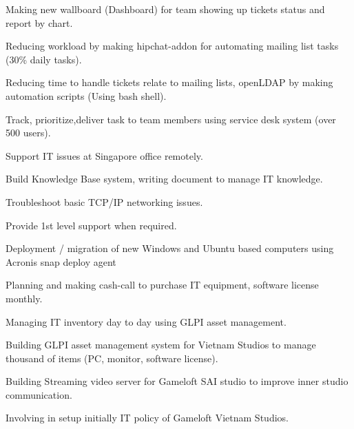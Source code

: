 \documentclass[letterpaper]{deedy-resume} %
\begin{document}
\begin{minipage}[t]{0.66\textwidth}
\begin{tightitemize}
\end{tightitemize}

\begin{tightitemize}
\item Making new wallboard (Dashboard) for team showing up tickets status and report by chart.
\item Reducing workload by making hipchat-addon for automating mailing list tasks (30\% daily tasks).
\item Reducing time to handle tickets relate to mailing lists, openLDAP by making automation scripts (Using bash shell).
\end{tightitemize}
\sectionspace %



\begin{tightitemize}
\item Track, prioritize,deliver task to team members using service desk system (over 500 users).
\item Support IT issues at Singapore office remotely.
\item Build Knowledge Base system, writing document to manage IT knowledge.
\item Troubleshoot basic TCP/IP networking issues.
\item Provide 1st level support when required.
\item Deployment / migration of new Windows and Ubuntu based computers using Acronis snap deploy agent
\item Planning and making cash-call to purchase IT equipment, software license monthly.
\item Managing IT inventory day to day using GLPI asset management.
\end{tightitemize}

\begin{tightitemize}
\item Building GLPI asset management system for Vietnam Studios to manage thousand of items (PC, monitor, software license).
\item Building Streaming video server for Gameloft SAI studio to improve inner studio communication.
\item Involving in setup initially IT policy of Gameloft Vietnam Studios.
\end{tightitemize}


\end{minipage}
\end{document}
